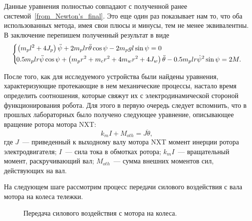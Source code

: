 \documentclass[12pt,a4paper,openany]{extarticle}
\begin{document}
Данные уравнения полностью совпадают с полученной ранее системой~\eqref{from_Newton's_final}.
Это еще один раз показывает нам то, что оба использованных метода, имея свои плюсы и минусы, тем не менее эквивалентны. 
В заключение перепишем полученный результат в виде
\begin{equation}\label{final_in_mech}
	\left\{  
	\begin{aligned}
		\!&\left(m_pl^2 + 4J_p\right)\ddot\psi + 2m_plr\ddot\theta\cos\psi - 2m_pgl\sin\psi= 0\\
		\!&0.5m_plr\ddot\psi\cos\psi + \left(m_pr^2 + m_cr^2 + 4m_wr^2 + 4J_w\right)\ddot\theta - 	
			0.5m_plr\dot\psi^2\sin\psi = 2M\ldotp
	\end{aligned}   
	\right.
\end{equation}

После того, как для исследуемого устройства были найдены уравнения, характеризующие протекающие в нем механические процессы, настало время определить соотношения, которые свяжут их с электродинамической стороной функционирования робота.
Для этого в первую очередь следует вспомнить, что в прошлых лабораторных было получено следующее уравнение, описывающее вращение ротора мотора NXT:
\begin{equation}\label{servo}
	k_mI + M_{oth} = J\ddot\theta,
\end{equation}
где $J$~--- приведенный к выходному валу мотора NXT момент инерции ротора электродвигателя; $I$~--- сила тока в обмотках ротора; $k_mI$~--- вращательный момент, раскручивающий вал; $M_{oth}$~--- сумма внешних моментов сил, действующих на вал.

На следующем шаге рассмотрим процесс передачи силового воздействия с вала мотора на колеса тележки.

\begin{figure}[h]
	\noindent{}
	\caption{Передача силового воздействия с мотора на колеса.}
	\label{for_M}
\end{figure}
\end{document}
